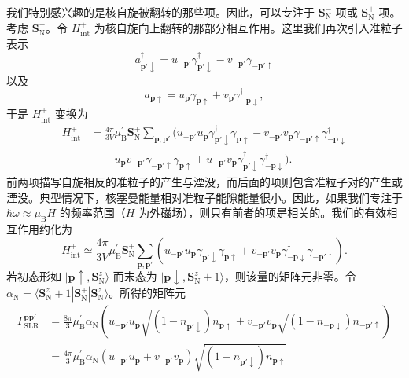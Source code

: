 我们特别感兴趣的是核自旋被翻转的那些项。因此，可以专注于 $\mathbf{S}_{\mathrm{N}}^{-}$ 项或 $\mathbf{S}_{\mathrm{N}}^{+}$ 项。考虑 $\mathbf{S}_{\mathrm{N}}^{+}$。令 $H_{\mathrm{int}}^{+}$ 为核自旋向上翻转的那部分相互作用。这里我们再次引入准粒子表示
\begin{equation*}
a_{\mathbf{p}'\downarrow}^{\dagger}=u_{-\mathbf{p}'}\gamma_{\mathbf{p}'\downarrow}^{\dagger}-v_{-\mathbf{p}'}\gamma_{-\mathbf{p}'\uparrow}\tag{12.302}
\end{equation*}
以及
\begin{equation*}
a_{\mathbf{p}\uparrow}=u_{\mathbf{p}}\gamma_{\mathbf{p}\uparrow}+v_{\mathbf{p}}\gamma_{-\mathbf{p}\downarrow}^{\dagger},\tag{12.303}
\end{equation*}
于是 $H_{\mathrm{int}}^{+}$ 变换为
\begin{align*}
H_{\mathrm{int}}^{+}&=\frac{4\pi}{3V}\mu_{\mathrm{B}}^{\prime}\mathbf{S}_{\mathrm{N}}^{+}\sum_{\mathbf{p},\mathbf{p}'}\Big(u_{-\mathbf{p}'}u_{\mathbf{p}}\gamma_{\mathbf{p}'\downarrow}^{\dagger}\gamma_{\mathbf{p}\uparrow}-v_{-\mathbf{p}'}v_{\mathbf{p}}\gamma_{-\mathbf{p}'\uparrow}\gamma_{-\mathbf{p}\downarrow}^{\dagger}\\
&\quad-u_{\mathbf{p}}v_{-\mathbf{p}'}\gamma_{-\mathbf{p}'\uparrow}\gamma_{\mathbf{p}\uparrow}+u_{-\mathbf{p}'}v_{\mathbf{p}}\gamma_{\mathbf{p}'\downarrow}^{\dagger}\gamma_{-\mathbf{p}\downarrow}^{\dagger}\Big).\tag{12.304}
\end{align*}
前两项描写自旋相反的准粒子的产生与湮没，而后面的项则包含准粒子对的产生或湮没。典型情况下，核塞曼能量相对准粒子能隙能量很小。因此，如果我们专注于 $\hbar\omega\approx\mu_{\mathrm{B}}H$ 的频率范围（$H$ 为外磁场），则只有前者的项是相关的。我们的有效相互作用约化为
\begin{equation*}
H_{\mathrm{int}}^{+}\simeq\frac{4\pi}{3V}\mu_{\mathrm{B}}^{\prime}\mathbf{S}_{\mathrm{N}}^{+}\sum_{\mathbf{p},\mathbf{p}'}\left(u_{-\mathbf{p}'}u_{\mathbf{p}}\gamma_{\mathbf{p}'\downarrow}^{\dagger}\gamma_{\mathbf{p}\uparrow}+v_{-\mathbf{p}'}v_{\mathbf{p}}\gamma_{-\mathbf{p}\downarrow}^{\dagger}\gamma_{-\mathbf{p}'\uparrow}\right).\tag{12.305}
\end{equation*}
若初态形如 $|\mathbf{p}\uparrow,\mathbf{S}_{\mathrm{N}}^{z}\rangle$ 而末态为 $|\mathbf{p}\downarrow,\mathbf{S}_{\mathrm{N}}^{z}+1\rangle$，则该量的矩阵元非零。令 $\alpha_{\mathrm{N}}=\langle\mathbf{S}_{\mathrm{N}}^{z}+1|\mathbf{S}_{\mathrm{N}}^{+}|\mathbf{S}_{\mathrm{N}}^{z}\rangle$。所得的矩阵元
\begin{align*}
\Gamma_{\mathrm{SLR}}^{\mathbf{p}\mathbf{p}'}&=\frac{8\pi}{3}\mu_{\mathrm{B}}^{\prime}\alpha_{\mathrm{N}}\left(u_{-\mathbf{p}'}u_{\mathbf{p}}\sqrt{\left(1-n_{\mathbf{p}'\downarrow}\right)n_{\mathbf{p}\uparrow}}+v_{-\mathbf{p}'}v_{\mathbf{p}}\sqrt{\left(1-n_{-\mathbf{p}\downarrow}\right)n_{-\mathbf{p}'\uparrow}}\right)\\
&=\frac{4\pi}{3}\mu_{\mathrm{B}}^{\prime}\alpha_{\mathrm{N}}\left(u_{-\mathbf{p}'}u_{\mathbf{p}}+v_{-\mathbf{p}'}v_{\mathbf{p}}\right)\sqrt{\left(1-n_{\mathbf{p}'\downarrow}\right)n_{\mathbf{p}\uparrow}}\tag{12.306}
\end{align*}
